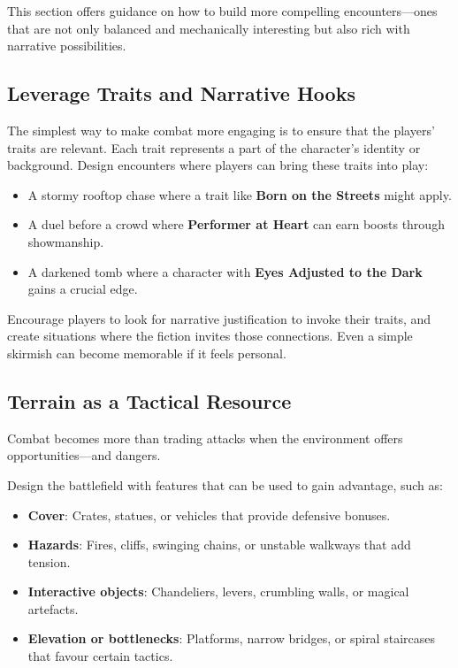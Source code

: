 \begin{multicols}{2}
This section offers guidance on how to build more compelling encounters—ones that are not only balanced and mechanically interesting but also rich with narrative possibilities.

\subsection*{Leverage Traits and Narrative Hooks}

The simplest way to make combat more engaging is to ensure that the players’ traits are relevant. Each trait represents a part of the character’s identity or background. Design encounters where players can bring these traits into play:

\begin{itemize}
  \item A stormy rooftop chase where a trait like \textbf{Born on the Streets} might apply.
  \item A duel before a crowd where \textbf{Performer at Heart} can earn boosts through showmanship.
  \item A darkened tomb where a character with \textbf{Eyes Adjusted to the Dark} gains a crucial edge.
\end{itemize}

Encourage players to look for narrative justification to invoke their traits, and create situations where the fiction invites those connections. Even a simple skirmish can become memorable if it feels personal.

\subsection*{Terrain as a Tactical Resource}

Combat becomes more than trading attacks when the environment offers opportunities—and dangers.

Design the battlefield with features that can be used to gain advantage, such as:

\begin{itemize}
  \item \textbf{Cover}: Crates, statues, or vehicles that provide defensive bonuses.
  \item \textbf{Hazards}: Fires, cliffs, swinging chains, or unstable walkways that add tension.
  \item \textbf{Interactive objects}: Chandeliers, levers, crumbling walls, or magical artefacts.
  \item \textbf{Elevation or bottlenecks}: Platforms, narrow bridges, or spiral staircases that favour certain tactics.
\end{itemize}


\end{multicols}
